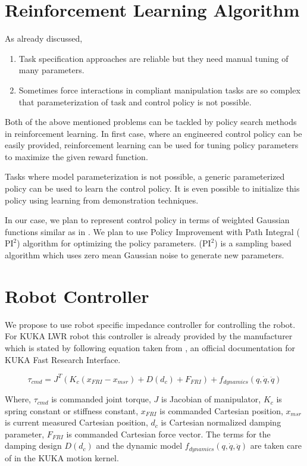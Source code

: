 \documentclass[thesis]{mas_proposal}
\begin{document}
\section{Reinforcement Learning Algorithm}

As already discussed, \begin{enumerate}
	\item Task specification approaches are reliable but they need manual tuning of many parameters.
	\item Sometimes force interactions in compliant manipulation tasks are so complex that parameterization of task and control policy is not possible. 
\end{enumerate}
Both of the above mentioned problems can be tackled by policy search methods in reinforcement learning. In first case, where an engineered control policy can be easily provided, reinforcement learning can be used for tuning policy parameters to maximize the given reward function.

Tasks where model parameterization is not possible, a generic parameterized policy can be used to learn the control policy. It is even possible to initialize this policy using learning from demonstration techniques.

In our case, we plan to represent control policy in terms of weighted Gaussian functions similar as in \cite{nemec2017door}. We plan to use Policy Improvement with Path Integral ($\text{PI}^{2}$) algorithm\cite{theodorou2010learning} for optimizing the policy parameters. ($\text{PI}^{2}$) is a sampling based algorithm which uses zero mean Gaussian noise to generate new parameters.   

\section{Robot Controller}

We propose to use robot specific impedance controller for controlling the robot. For KUKA LWR robot this controller is already provided by the manufacturer which is stated by following equation taken from \cite{schreiber2010fast}, an official documentation for KUKA Fast Research Interface.

\begin{equation}
\tau_{cmd} = J^{T}(K_{c}(x_{FRI} - x_{msr}) + D(d_{c}) + F_{FRI}) + f_{dynamics}(q, \dot{q}, \ddot{q})
\end{equation}

Where,
$\tau_{cmd}$ is commanded joint torque, $J$ is Jacobian of manipulator, $K_{c}$ is spring constant or stiffness constant, $x_{FRI}$ is commanded Cartesian position, $x_{msr}$ is current measured Cartesian position, $d_{c}$ is Cartesian normalized damping parameter, $F_{FRI}$ is commanded Cartesian force vector. The terms for the damping design $D(d_{c})$ and the dynamic model $f_{dynamics}(q, \dot{q}, \ddot{q})$ are taken care of in the KUKA motion
kernel.   
\end{document}
